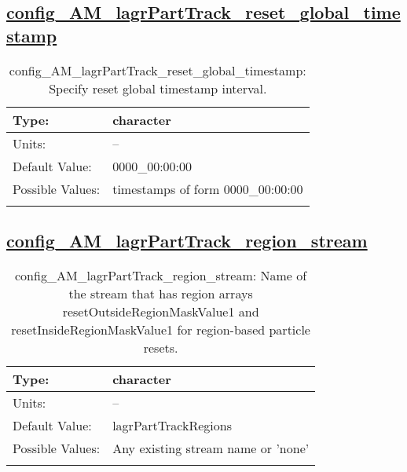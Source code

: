 \subsection[config\_AM\_lagrPartTrack\_reset\_global\_timestamp]{\hyperref[sec:nm_tab_AM_lagrPartTrack]{config\_AM\_lagrPartTrack\_reset\_global\_timestamp}}
\label{subsec:nm_sec_config_AM_lagrPartTrack_reset_global_timestamp}
\begin{center}
\begin{longtable}{| p{2.0in} || p{4.0in} |}
    \hline
    Type: & character \\
    \hline
    Units: & -- \\
    \hline
    Default Value: & 0000\_00:00:00 \\
    \hline
    Possible Values: & timestamps of form 0000\_00:00:00 \\
    \hline
    \caption{config\_AM\_lagrPartTrack\_reset\_global\_timestamp: Specify reset global timestamp interval.}
\end{longtable}
\end{center}
\subsection[config\_AM\_lagrPartTrack\_region\_stream]{\hyperref[sec:nm_tab_AM_lagrPartTrack]{config\_AM\_lagrPartTrack\_region\_stream}}
\label{subsec:nm_sec_config_AM_lagrPartTrack_region_stream}
\begin{center}
\begin{longtable}{| p{2.0in} || p{4.0in} |}
    \hline
    Type: & character \\
    \hline
    Units: & -- \\
    \hline
    Default Value: & lagrPartTrackRegions \\
    \hline
    Possible Values: & Any existing stream name or 'none' \\
    \hline
    \caption{config\_AM\_lagrPartTrack\_region\_stream: Name of the stream that has region arrays resetOutsideRegionMaskValue1 and resetInsideRegionMaskValue1 for region-based particle resets.}
\end{longtable}
\end{center}
